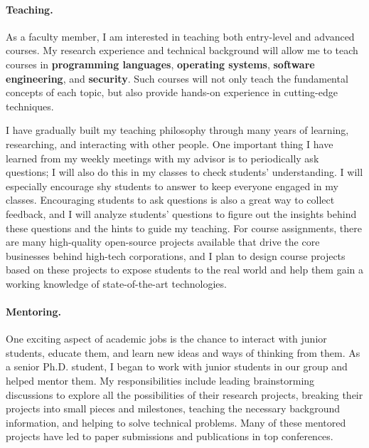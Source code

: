\documentclass[10pt]{article}
\begin{document}
\vspace{-0.12in}
\paragraph*{Teaching.}
As a faculty member, I am interested in teaching both entry-level and advanced courses. My research experience and technical background will allow me to teach courses in {\bf programming languages}, {\bf operating systems}, {\bf software engineering}, and {\bf security}. Such courses will not only teach the fundamental concepts of each topic, but also provide hands-on experience in cutting-edge techniques.

I have gradually built my teaching philosophy through many years of learning, researching, and interacting with other people. 
One important thing I have learned from my weekly meetings with my advisor is to periodically ask questions; 
I will also do this in my classes to check students' understanding. 
I will especially encourage shy students to answer to keep everyone engaged in my classes. 
Encouraging students to ask questions is also a great way to collect feedback, and I will analyze students' questions to figure out the insights behind these questions and
the hints to guide my teaching. 
For course assignments, there are many high-quality open-source projects
available that drive the core businesses behind high-tech corporations, and I plan to design course projects 
based on these projects to expose students to the real world and help them gain a working knowledge of state-of-the-art technologies.


\vspace{-0.12in}
\paragraph*{Mentoring.}
One exciting aspect of academic jobs is the chance to interact with junior students, educate them, and learn new ideas and ways of thinking from them. 
As a senior Ph.D. student, I began to work with junior students in
our group and helped mentor them. 
My responsibilities include leading brainstorming discussions to explore all
the possibilities of their research projects, breaking their projects into small pieces and milestones, 
teaching the necessary background information, and helping to solve technical problems. 
Many of these mentored projects have
led to paper submissions and publications in top conferences.
\end{document}
